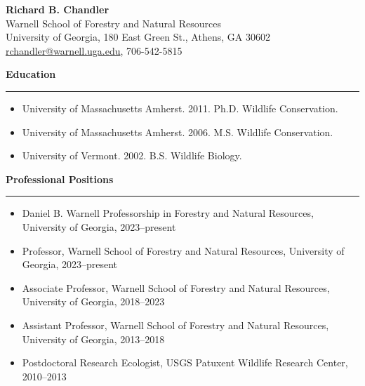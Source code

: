 \documentclass[12pt]{article}
\begin{document}
\flushleft

% 

\singlespacing
\thispagestyle{plain} %

\begin{center}
{\large \bf Richard B. Chandler} \\
Warnell School of Forestry and Natural Resources \\ %
University of Georgia, %
180 East Green St., Athens, GA 30602 \\
\href{mailto:rchandler@warnell.uga.edu}{rchandler@warnell.uga.edu},  %
706-542-5815 \\
\end{center}


\vspace{0.8cm}

{\large \bf Education} \\
\rule[3mm]{\textwidth}{0.3mm}

\begin{itemize}
    \item \textnormal{University of Massachusetts Amherst}. 2011. Ph.D. Wildlife Conservation. 
    \item \textnormal{University of Massachusetts Amherst}. 2006. M.S. Wildlife Conservation. 
    \item \textnormal{University of Vermont}. 2002. B.S. Wildlife Biology. 
\end{itemize}


\vspace{0.5cm}

{\large \bf Professional Positions} \\
\rule[3mm]{\textwidth}{0.3mm}

\begin{itemize}

\item Daniel B. Warnell Professorship in Forestry and Natural
  Resources, University of Georgia, 2023--present 

\item \textnormal{Professor}, Warnell School of Forestry and
  Natural Resources, 
  University of Georgia, 2023--present

\item \textnormal{Associate Professor}, Warnell School of Forestry and
  Natural Resources, 
  University of Georgia, 2018--2023

\item \textnormal{Assistant Professor}, Warnell School of Forestry and
  Natural Resources, 
  University of Georgia, 2013--2018
  
\item \textnormal{Postdoctoral Research Ecologist}, USGS Patuxent
  Wildlife Research Center, 2010--2013

\end{itemize}
\end{document}
